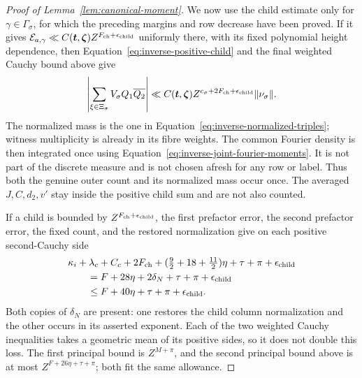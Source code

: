 \documentclass[11pt,a4paper]{article}
\numberwithin{equation}{section}
\numberwithin{figure}{section}
\theoremstyle{definition}
\theoremstyle{remark}
\begin{document}
\begin{proof}[Proof of Lemma~\ref{lem:canonical-moment}]
We now use the child estimate only for
\(\gamma\in\Gamma_\sigma\), for which the preceding margins and row
decrease have been proved.  If it gives
\(\mathcal E_{a,\gamma}\ll C(\boldsymbol t,\boldsymbol\zeta)
Z^{F_{\rm ch}+\epsilon_{\rm child}}\) uniformly there, with its
fixed polynomial height dependence, then
Equation~\eqref{eq:inverse-positive-child} and the final weighted
Cauchy bound above give
\[
 \left|\sum_{\xi\in\Xi_\sigma}V_\sigma Q_1\overline{Q_2}\right|
 \ll C(\boldsymbol t,\boldsymbol\zeta)
 Z^{c_\sigma+2F_{\rm ch}+\epsilon_{\rm child}}\|\nu_\sigma\|.
\]
The normalized mass is the one in
Equation~\eqref{eq:inverse-normalized-triples}; witness multiplicity
is already in its fibre weights.  The common Fourier density is then
integrated once using Equation~\eqref{eq:inverse-joint-fourier-moments}.
It is not part of the discrete measure and is not chosen afresh for
any row or label.  Thus both the genuine outer count and its normalized
mass occur once.  The averaged \(J,C,d_2,v'\) stay inside the positive
child sum and are not also counted.

If a child is bounded by \(Z^{F_{\rm ch}+\epsilon_{\rm child}}\), the
first prefactor error, the second prefactor error, the fixed count, and
the restored normalization give on each positive second-Cauchy side
\begin{equation}\label{eq:inverse-step-loss}
 \begin{split}
 &\kappa_i+\lambda_c+C_c+2F_{\rm ch}
      +(\tfrac92+18+\tfrac{11}2)\eta+\tau+\pi+\epsilon_{\rm child}\\
 &\qquad=F+28\eta+2\delta_N+\tau+\pi+\epsilon_{\rm child}\\
 &\qquad\le F+40\eta+\tau+\pi+\epsilon_{\rm child}.
 \end{split}
\end{equation}
Both copies of \(\delta_N\) are present: one restores the child column
normalization and the other occurs in its asserted exponent.  Each of
the two weighted Cauchy inequalities takes a geometric mean of its
positive sides, so it does not double this loss.  The first principal
bound is \(Z^{M+\pi}\), and the second principal bound above is at most
\(Z^{F+26\eta+\tau+\pi}\); both fit the same allowance.


\end{proof}
\end{document}
